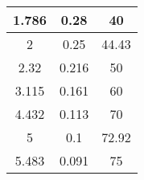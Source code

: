 \documentclass{article}[11pt]
\begin{document}
\begin{table}[H]
\begin{tabular}{ccc}
1.786                    & 0.28                      & 40                              \\ \midrule
2                        & 0.25                      & 44.43                           \\ \midrule
2.32                     & 0.216                     & 50                              \\ \midrule
3.115                    & 0.161                     & 60                              \\ \midrule
4.432                    & 0.113                     & 70                              \\ \midrule
5                        & 0.1                       & 72.92                           \\ \midrule
5.483                    & 0.091                     & 75                              \\ \toprule
\end{tabular}
\label{tab:os}
\end{table}
\end{document}
